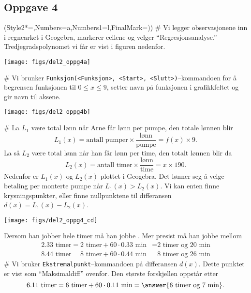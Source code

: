 \subsection*{Oppgave 4}
\begin{easylist}[enumerate]
	\ListProperties(Style2*=,Numbers=a,Numbers1=l,FinalMark={)})
	# Vi legger observasjonene inn i regnearket i Geogebra, markerer cellene og velger ``Regresjonsanalyse.'' Tredjegradspolynomet vi får er vist i figuren nedenfor.
	\begin{center}
		\texttt{[image: figs/del2\_oppg4a]}
	\end{center}
	# Vi brunker \verb|Funksjon(<Funksjon>, <Start>, <Slutt>)|--kommandoen
	for å begrensen funksjonen til $0 \leq x \leq 9$, setter navn på funksjonen i grafikkfeltet og gir navn til aksene.
	\begin{center}
		\texttt{[image: figs/del2\_oppg4b]}
	\end{center}
	# La $L_1$ være total lønn når Arne får lønn per pumpe, den totale lønnen blir
	\begin{equation*}
		L_1(x) = \text{antall pumper} \times \frac{\text{lønn}}{\text{pumpe}}
		= f(x) \times 9.
	\end{equation*}
	La så $L_2$ være total lønn når han får lønn per time, den totalt lønnen blir da 
	\begin{equation*}
	L_2(x) = \text{antall timer} \times \frac{\text{lønn}}{\text{time}}
	= x \times 190.
	\end{equation*}
	Nedenfor er $L_1(x)$ og $L_2(x)$ plottet i Geogebra. Det lønner seg å velge betaling per monterte pumpe når $L_1(x) > L_2(x)$.
	Vi kan enten finne krysningspunkter, eller finne nullpunktene til differansen $d(x) = L_1(x) - L_2(x)$.
	\begin{center}
		\texttt{[image: figs/del2\_oppg4\_cd]}
	\end{center}
	Dersom han jobber hele timer må han jobbe .
	Mer presist må han jobbe mellom
	\begin{align*}
		2.33 \text{ timer} = 2 \text{ timer} +  60 \cdot 0.33 \text{ min} &= \text{2 timer og 20 min} \\
		8.44 \text{ timer} = 8 \text{ timer} +  60 \cdot 0.44 \text{ min} &= \text{8 timer og 26 min}
	\end{align*}
	# Vi bruker \verb|Ekstremalpunkt|--kommandoen på differansen $d(x)$. Dette punktet er vist som  ``Maksimaldiff'' ovenfor. Den største forskjellen oppstår etter
	\begin{equation*}
		6.11 \text{ timer} = 6 \text{ timer} +  60 \cdot 0.11 \text{ min} = \answer{\text{6 timer og 7 min}}.
	\end{equation*}
\end{easylist}




